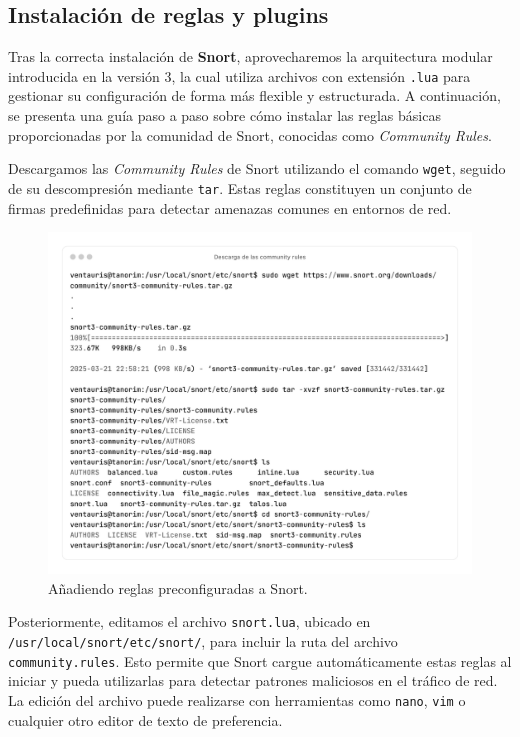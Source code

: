 \documentclass[12pt,a4paper]{report}
\begin{document}

\newpage

\subsection{Instalación de reglas y plugins}

Tras la correcta instalación de \textbf{Snort}, aprovecharemos la arquitectura modular introducida en la versión 3, la cual utiliza archivos con extensión \texttt{.lua} para gestionar su configuración de forma más flexible y estructurada. A continuación, se presenta una guía paso a paso sobre cómo instalar las reglas básicas proporcionadas por la comunidad de Snort, conocidas como \textit{Community Rules}.
\newline

Descargamos las \textit{Community Rules} de Snort utilizando el comando \texttt{wget}, seguido de su descompresión mediante \texttt{tar}. Estas reglas constituyen un conjunto de firmas predefinidas para detectar amenazas comunes en entornos de red.

\begin{figure}[H]
	\centering
	\includegraphics[scale=0.12]{instalacion_reglas_snort/1-1.png}
	\caption{Añadiendo reglas preconfiguradas a Snort.}
\end{figure}

\pagebreak

Posteriormente, editamos el archivo \texttt{snort.lua}, ubicado en \texttt{/usr/local/snort/etc/snort/}, para incluir la ruta del archivo \texttt{community.rules}. Esto permite que Snort cargue automáticamente estas reglas al iniciar y pueda utilizarlas para detectar patrones maliciosos en el tráfico de red. La edición del archivo puede realizarse con herramientas como \texttt{nano}, \texttt{vim} o cualquier otro editor de texto de preferencia.
\end{document}
